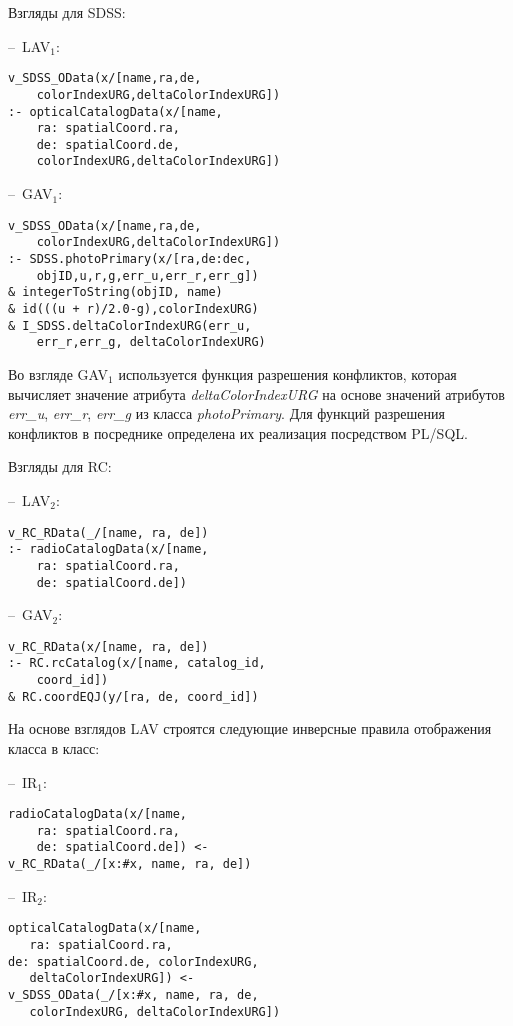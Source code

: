 \begin{multicols}{2}
     Взгляды для SDSS:

--~LAV$_1$:
\begin{verbatim}
v_SDSS_OData(x/[name,ra,de,
    colorIndexURG,deltaColorIndexURG])
:- opticalCatalogData(x/[name,
    ra: spatialCoord.ra,
    de: spatialCoord.de,
    colorIndexURG,deltaColorIndexURG])
\end{verbatim}

--~GAV$_1$:
\begin{verbatim}
v_SDSS_OData(x/[name,ra,de,
    colorIndexURG,deltaColorIndexURG])
:- SDSS.photoPrimary(x/[ra,de:dec,
    objID,u,r,g,err_u,err_r,err_g])
& integerToString(objID, name)
& id(((u + r)/2.0-g),colorIndexURG)
& I_SDSS.deltaColorIndexURG(err_u,
    err_r,err_g, deltaColorIndexURG)
\end{verbatim}


Во взгляде GAV$_1$ используется функция разрешения конфликтов, которая
вычисляет значение атрибута \textit{deltaColorIndexURG} на основе значений атрибутов
\textit{err\_u}, \textit{err\_r}, \textit{err\_g} из класса \mbox{\textit{photoPrimary}}. Для функций
разрешения конфликтов в посреднике определена их реализация посредством %
 PL/SQL.
 {
 
 }

     Взгляды для RC:

--~LAV$_2$:
\begin{verbatim}
v_RC_RData(_/[name, ra, de])
:- radioCatalogData(x/[name,
    ra: spatialCoord.ra,
    de: spatialCoord.de])
\end{verbatim}

--~GAV$_2$:
\begin{verbatim}
v_RC_RData(x/[name, ra, de])
:- RC.rcCatalog(x/[name, catalog_id,
    coord_id])
& RC.coordEQJ(y/[ra, de, coord_id])
\end{verbatim}

 На основе взглядов LAV строятся следующие инверсные правила отображения
класса в класс:

--~IR$_1$:
\begin{verbatim}
radioCatalogData(x/[name,
    ra: spatialCoord.ra,
    de: spatialCoord.de]) <-
v_RC_RData(_/[x:#x, name, ra, de])
\end{verbatim}

--~IR$_2$:
\begin{verbatim}
opticalCatalogData(x/[name,
   ra: spatialCoord.ra,
de: spatialCoord.de, colorIndexURG,
   deltaColorIndexURG]) <-
v_SDSS_OData(_/[x:#x, name, ra, de,
   colorIndexURG, deltaColorIndexURG])
\end{verbatim}


\end{multicols}
